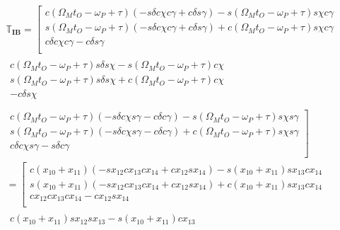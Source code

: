 \begin{multline} \label{eq:IBtrans}
\mathbb{T}_{\mathbf{IB}}=
\left[
\begin{matrix}
c\left(\Omega_{M}t_{O}-\omega_{P}+\tau\right)\left(-s\delta c\chi c\gamma +c\delta s\gamma \right)-s\left(\Omega_{M}t_{O}-\omega_{P}+\tau\right) s\chi c\gamma    \\
s\left(\Omega_{M}t_{O}-\omega_{P}+\tau\right)\left(-s\delta c\chi c\gamma +c\delta s\gamma \right)+c\left(\Omega_{M}t_{O}-\omega_{P}+\tau\right) s\chi c\gamma   \\
c\delta c\chi c\gamma -c\delta s\gamma    \\
\end{matrix}  \right.
\\
\begin{matrix}
c\left(\Omega_{M}t_{O}-\omega_{P}+\tau\right) s\delta s\chi -s\left(\Omega_{M}t_{O}-\omega_{P}+\tau\right) c\chi\\
s\left(\Omega_{M}t_{O}-\omega_{P}+\tau\right) s\delta s\chi +c\left(\Omega_{M}t_{O}-\omega_{P}+\tau\right) c\chi \\
 -c\delta s\chi \\
\end{matrix}
\\
\left.
\begin{matrix}
c\left(\Omega_{M}t_{O}-\omega_{P}+\tau\right)\left(-s\delta c\chi s\gamma -c\delta c\gamma \right)-s\left(\Omega_{M}t_{O}-\omega_{P}+\tau\right) s\chi s\gamma\\
s\left(\Omega_{M}t_{O}-\omega_{P}+\tau\right)\left(-s\delta c\chi s\gamma -c\delta c\gamma \right)+c\left(\Omega_{M}t_{O}-\omega_{P}+\tau\right) s\chi s\gamma \\
c\delta c\chi s\gamma -s\delta c\gamma\\
\end{matrix}
\right]\\
=
\left[
\begin{matrix}
c\left(x_{10}+x_{11}\right)\left(-sx_{12} cx_{13} cx_{14} +cx_{12} sx_{14} \right)-s\left(x_{10}+x_{11}\right) sx_{13} cx_{14}    \\
s\left(x_{10}+x_{11}\right)\left(-sx_{12} cx_{13} cx_{14} +cx_{12} sx_{14} \right)+c\left(x_{10}+x_{11}\right) sx_{13} cx_{14}    \\
cx_{12} cx_{13} cx_{14} -cx_{12} sx_{14}   \\
\end{matrix} \right.
\\
\begin{matrix}
c\left(x_{10}+x_{11}\right) sx_{12} sx_{13} -s\left(x_{10}+x_{11}\right) cx_{13} \\

\end{matrix}
\end{multline}
